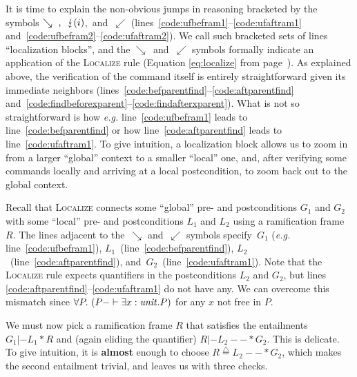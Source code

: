\documentclass[acmsmall,screen]{acmart}
\newcommand{\defeq}{\mathbin{\stackrel{\triangle}{=}}}
\begin{document}
It is time to explain the non-obvious jumps in reasoning bracketed by the
symbols $\searrow~\text{, }~\lightning(i)$,~and~$\swarrow$
(lines~\ref{code:ufbefram1}--\ref{code:ufaftram1} and~\ref{code:ufbefram2}--\ref{code:ufaftram2}). We call such bracketed sets of lines ``localization blocks'',
and the $\searrow$~and~$\swarrow$ symbols formally indicate an application
of the \textsc{Localize} rule (Equation \ref{eq:localize} from page~\pageref{eq:localize}).
As explained above, the verification of the command itself is entirely
straightforward given its immediate neighbors
(lines~\ref{code:befparentfind}--\ref{code:aftparentfind}
and~\ref{code:findbeforexparent}--\ref{code:findafterxparent}).
What is not so straightforward is how \emph{e.g.} line~\ref{code:ufbefram1}
leads to line~\ref{code:befparentfind} or how line~\ref{code:aftparentfind}
leads to line~\ref{code:ufaftram1}.
To give intuition, a localization block allows us to zoom in from a larger
``global'' context to a smaller ``local'' one, and, after verifying some commands
locally and arriving at a local postcondition, to zoom back out to the global
context. 

Recall that \textsc{Localize} connects some ``global'' pre- and postconditions $G_1$ and $G_2$
with some ``local'' pre- and postconditions $L_1$ and $L_2$ using a ramification
frame $R$.
The lines adjacent to
the~$\searrow$ and~$\swarrow$ symbols specify~$G_1$ (\emph{e.g.} line~\ref{code:ufbefram1}),
$L_1$~(line~\ref{code:befparentfind}),
$L_2$~(line~\ref{code:aftparentfind}), and~$G_2$~(line~\ref{code:ufaftram1}).
Note that the \textsc{Localize} rule expects quantifiers in the postconditions $L_2$ and $G_2$,
but lines \ref{code:aftparentfind}--\ref{code:ufaftram1} do not have any.  We can overcome
this mismatch since $\forall P.~ (P -|- \exists x : \mathit{unit}.P)$ for any $x$ not free in $P$. 


We must now pick a ramification frame $R$ that satisfies
the entailments $G_1 |- L_1 * R$ and (again eliding the quantifier) $R |- L_2 --* G_2$.
This is delicate.  To give intuition, it is \textbf{almost} enough to 
choose
$R \defeq L_2 --* G_2$, which makes the second entailment trivial, and leaves us with three checks.
\end{document}
